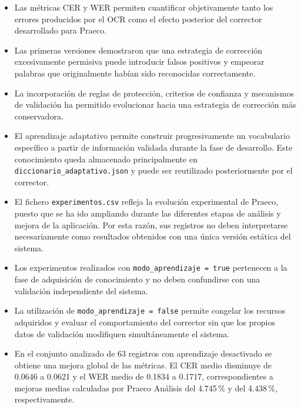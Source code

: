 \begin{itemize}
	
	\item Las métricas CER y WER permiten cuantificar objetivamente tanto los errores producidos por el OCR como el efecto posterior del corrector desarrollado para Praeco.
	
	\item Las primeras versiones demostraron que una estrategia de corrección excesivamente permisiva puede introducir falsos positivos y empeorar palabras que originalmente habían sido reconocidas correctamente.
	
	\item La incorporación de reglas de protección, criterios de confianza y mecanismos de validación ha permitido evolucionar hacia una estrategia de corrección más conservadora.
	
	\item El aprendizaje adaptativo permite construir progresivamente un vocabulario específico a partir de información validada durante la fase de desarrollo. Este conocimiento queda almacenado principalmente en \texttt{diccionario\_adaptativo.json} y puede ser reutilizado posteriormente por el corrector.
	
	\item El fichero \texttt{experimentos.csv} refleja la evolución experimental de Praeco, puesto que se ha ido ampliando durante las diferentes etapas de análisis y mejora de la aplicación. Por esta razón, sus registros no deben interpretarse necesariamente como resultados obtenidos con una única versión estática del sistema.
	
	\item Los experimentos realizados con \texttt{modo\_aprendizaje = true} pertenecen a la fase de adquisición de conocimiento y no deben confundirse con una validación independiente del sistema.
	
	\item La utilización de \texttt{modo\_aprendizaje = false} permite congelar los recursos adquiridos y evaluar el comportamiento del corrector sin que los propios datos de validación modifiquen simultáneamente el sistema.
	
	\item En el conjunto analizado de 63 registros con aprendizaje desactivado se obtiene una mejora global de las métricas. El CER medio disminuye de 0.0646 a 0.0621 y el WER medio de 0.1834 a 0.1717, correspondientes a mejoras medias calculadas por Praeco Análisis del 4.745\,\% y del 4.438\,\%, respectivamente.
	

\end{itemize}
